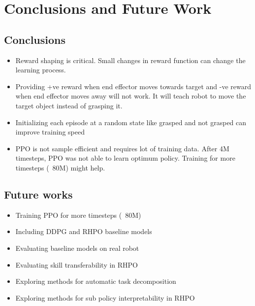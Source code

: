 \chapter{Conclusions and Future Work}

\section{Conclusions}
\begin{itemize}
	\item Reward shaping is critical. Small changes in reward function can change the learning process.
	\item Providing +ve reward when end effector moves towards target and -ve reward when end effector moves away will not work. It will teach robot to move the target object instead of grasping it.
	\item Initializing each episode at a random state like grasped and not grasped can improve training speed
	\item PPO is not sample efficient and requires lot of training data. After 4M timesteps, PPO was not able to learn optimum policy. Training for more timesteps (~80M) might help.
\end{itemize}

\section{Future works}
\begin{itemize}
	\item Training PPO for more timesteps (~80M)
	\item Including DDPG and RHPO baseline models
	\item Evaluating baseline models on real robot
	\item Evaluating skill transferability in RHPO
	\item Exploring methods for automatic task decomposition
	\item Exploring methods for sub policy interpretability in RHPO
\end{itemize}